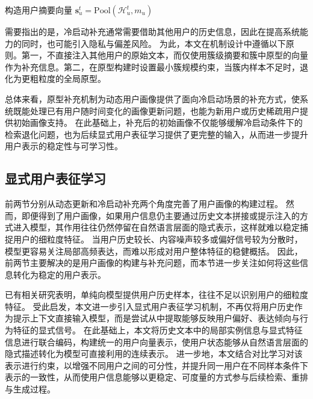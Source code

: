\begin{algorithm}[htbp]
\caption{用户画像原型补充流程}
\label{alg:prototype-supplement}

构造用户摘要向量 $\mathbf{s}_u^t=\mathrm{Pool}(\mathcal{H}_u^t,m_u)$\;
\;
\end{algorithm}

需要指出的是，冷启动补充通常需要借助其他用户的历史信息，因此在提高系统能力的同时，也可能引入隐私与偏差风险。
为此，本文在机制设计中遵循以下原则。第一，不直接注入其他用户的原始文本，而仅使用簇级摘要和簇中原型的向量作为补充信息。第二，在原型构建时设置最小簇规模约束，当簇内样本不足时，退化为更粗粒度的全局原型。

总体来看，原型补充机制为动态用户画像提供了面向冷启动场景的补充方式，使系统既能处理已有用户随时间变化的画像更新问题，也能为新用户或历史稀疏用户提供初始画像支持。
在此基础上，补充后的初始画像不仅能够缓解冷启动条件下的检索退化问题，也为后续显式用户表征学习提供了更完整的输入，从而进一步提升用户表示的稳定性与可学习性。

\subsection{显式用户表征学习}

前两节分别从动态更新和冷启动补充两个角度完善了用户画像的构建过程。
然而，即便得到了用户画像，如果用户信息仍主要通过历史文本拼接或提示注入的方式进入模型，其作用往往仍然停留在自然语言层面的隐式表示，这样就难以稳定捕捉用户的细粒度特征。
当用户历史较长、内容噪声较多或偏好信号较为分散时，模型更容易关注局部高频表达，而难以形成对用户整体特征的稳健概括。
因此，前两节主要解决的是用户画像的构建与补充问题，而本节进一步关注如何将这些信息转化为稳定的用户表示。


已有相关研究表明，单纯向模型提供用户历史样本，往往不足以识别用户的细粒度特征\cite{yazanImprovingRAGPersonalization2025}。
受此启发，本文进一步引入显式用户表征学习机制，不再仅将用户历史作为提示上下文直接输入模型，而是尝试从中提取能够反映用户偏好、表达倾向与行为特征的显式信号。
在此基础上，本文将历史文本中的局部实例信息与显式特征信息进行联合编码，构建统一的用户向量表示，使用户状态能够从自然语言层面的隐式描述转化为模型可直接利用的连续表示。
进一步地，本文结合对比学习对该表示进行约束，以增强不同用户之间的可分性，并提升同一用户在不同样本条件下表示的一致性，从而使用户信息能够以更稳定、可度量的方式参与后续检索、重排与生成过程。

